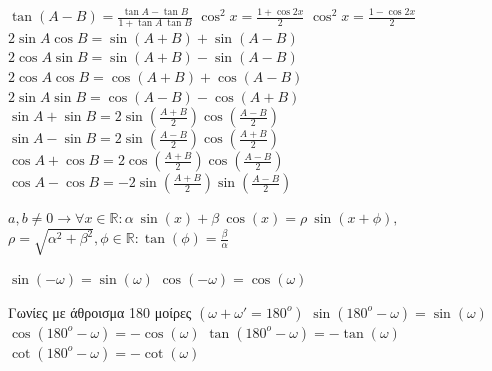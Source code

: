 \documentclass[12pt]{article}
\begin{document}
\begin{flushleft}
	\textbullet \quad $\displaystyle \tan (A - B) = \frac{\tan A - \tan B}{1 + \tan A \ \tan B} $ \linebreak 
	\textbullet \quad $\displaystyle \cos ^2 x = \frac{1 + \cos 2x}{2} $ \linebreak 
	\textbullet \quad $\displaystyle \cos ^2 x = \frac{1 - \cos 2x}{2	} $ \linebreak 
	\textbullet \quad $\displaystyle 2\sin A \cos B = \sin (A + B) + \sin (A -B) $ \linebreak 
	\textbullet \quad $\displaystyle 2\cos A \sin B = \sin (A + B) - \sin (A - B) $ \linebreak 
	\textbullet \quad $\displaystyle 2\cos A \cos B = \cos (A + B) + \cos (A - B) $ \linebreak 
	\textbullet \quad $\displaystyle 2\sin A \sin B = \cos (A - B) - \cos (A + B) $ \linebreak 
	\textbullet \quad $\displaystyle \sin A + \sin B = 2\sin \left( \frac{A + B}{2}\right) \cos \left(\frac{A-B}{2} \right) $ \linebreak 
	\textbullet \quad $\displaystyle \sin A - \sin B = 2\sin \left( \frac{A-B}{2} \right) \cos \left( \frac{A + B}{2} \right) $ \linebreak 
	\textbullet \quad $\displaystyle \cos A + \cos B = 2\cos \left( \frac{A + B}{2} \right) \cos \left( \frac{A - B}{2} \right) $ \linebreak 
	\textbullet \quad $\displaystyle \cos A - \cos B = -2\sin \left( \frac{A + B}{2} \right) \sin \left( \frac{A - B}{2} \right) $ \linebreak 
	
	\textbullet \quad $\displaystyle a, b \neq 0 \longrightarrow \forall x \in \mathbb{R}: \alpha \ \sin (x)  + \beta \ \cos (x) = \rho \ \sin (x + \phi) , $ \\ $\displaystyle \rho = \sqrt{\alpha^2 + \beta^2}, \phi \in \mathbb{R}: \tan (\phi) = \frac{\beta}{\alpha} $ \linebreak 

	\textbullet \quad $\displaystyle \sin (-\omega) = \sin (\omega) $ \linebreak 
	\textbullet \quad $\displaystyle \cos (-\omega) = \cos (\omega) $ \linebreak 
	
	\textgreek{Γωνίες με άθροισμα 180 μοίρες} $ ( { \omega + \omega' = 180^o} )$ \linebreak 	
	\textbullet \quad $\displaystyle \sin (180^o - \omega) = \sin (\omega) $ \linebreak 
	\textbullet \quad $\displaystyle \cos (180^o - \omega) = -\cos (\omega) $ \linebreak 	
	\textbullet \quad $\displaystyle \tan (180^o - \omega)  = -\tan ( \omega) $ \linebreak 
	\textbullet \quad $\displaystyle \cot (180^o - \omega) = -\cot (\omega) $ \linebreak 
	

\end{flushleft}
\end{document}
